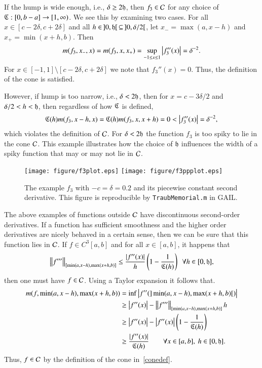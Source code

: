\documentclass[review]{elsarticle}
\theoremstyle{definition}
\begin{document}
If the hump is wide enough, i.e., $\delta \ge 2 \fh$, then $f_3 \in \cc$ for
any choice of $\fC : [0,b-a] \to [1,\infty)$.  We see this by examining two cases.  For all $x \in [c - 2 \delta, c + 2 \delta]$ and all $h \in \, ]0,\fh[ \, \subseteq \, ]0,\delta/2[$, let $x_- = \max(a, x -h)$ and $x_+ = \min(x +h,b)$.  Then
\[
m(f_3,x_-,x) = m(f_3,x,x_+) = \sup_{-1 \le x \le 1} \abs{f_3''(x)}  = \delta^{-2}.
\]
For $x \in [-1,1] \setminus [c - 2 \delta , c + 2 \delta]$ we note that $f_3''(x) = 0$. Thus, the definition of the cone is satisfied.

However, if hump is too narrow, i.e.,  $\delta < 2 \fh$, then for $x = c-3\delta/2$ and $\delta/2 < h < \fh$, then regardless of how $\fC$ is defined,
\[
\fC(h)m(f_3,x - h,x)=\fC(h)m(f_3,x,x+h)=0 < \abs{f''_3(x)} = \delta^{-2},
\]
which violates the definition of $\cc$.  For $\delta < 2 \fh$ the function $f_3$ is too spiky to lie in the cone $\cc$.   This example illustrates how the choice of $\fh$ influences the width of
a spiky function that may or may not lie in $\cc$.

\begin{figure}[t]
\centering
\texttt{[image: figure/f3plot.eps]} \quad
\texttt{[image: figure/f3ppplot.eps]}
\caption{The example $f_3$ with $-c=\delta = 0.2$ and its piecewise constant
second derivative. This figure is reproducible by {\tt TraubMemorial.m} in
GAIL.}
\label{f3fig}
\end{figure}

The above examples of functions outside $\cc$ have discontinuous second-order
derivatives.  If a function has sufficient smoothness and the higher order derivatives are nicely behaved in a certain sense, then we can be sure that this function lies in $\cc$.   If  $f \in C^3[a,b]$ and for all $x \in [a,b]$, it happens that
\begin{equation} \label{conesuffconda}
\norm[{[\min(a,x-h),\max(x+h,b)]}]{f'''} \le \frac{\abs{f''(x)}}{h} \left( 1 - \frac{1}{\fC(h)} \right) \ \ \forall h \in [0,\fh],
\end{equation}
then one must have $f \in \cc$.  Using a Taylor expansion it follows that.
\begin{align*}
m(f,\min(a,x-h),\max(x+h,b)) & = \inf \abs{f''(]\min(a,x-h),\max(x+h,b)[)} \\
& \ge \abs{f''(x)}  - \norm[{[\min(a,x-h),\max(x+h,b)]}]{f'''}h \\
& \ge \abs{f''(x)}  - \abs{f''(x)}\left( 1 - \frac{1}{\fC(h)} \right) \\
& \ge \frac{\abs{f''(x)}}{\fC(h)} \qquad \forall x \in [a,b],\ h \in [0,\fh].
\end{align*}
Thus, $f \in \cc$ by the definition of the cone in~\eqref{conedef}.
\end{document}
